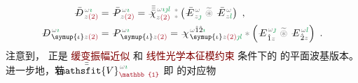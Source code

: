 \begin{subequations} \label{eq:DP^(2)-plane_wave_basis-p_pp}
\begin{align}
	\Xint{\mathcolor{gray}{-}}{30}{\bar{D}}^{\;\! \mathcolor{gray}{\omega} \textcolor{ForestGreen}{\imath}}_{\;\! \mathcolor{gray}{z} \textcolor{Maroon}{(2)}} &= \Xint{\mathcolor{gray}{-}}{30}{\bar{P}}^{\;\! \mathcolor{gray}{\omega} \textcolor{ForestGreen}{\imath}}_{\;\! \mathcolor{gray}{z} \textcolor{Maroon}{(2)}} = \Xint{{}^{}_{\mathcolor{gray}{-}}}{23}{\bar{\bar{\bar{\chi}}}}^{\;\! \mathcolor{gray}{\omega} \textcolor{ForestGreen}{\imath \jmath l}}_{\mathcolor{gray}{z} \textcolor{Maroon}{(2)}} ~{}^{\mathcolor{gray}{*}}_{\mathcolor{gray}{*}} \left( \Xint{\mathcolor{gray}{-}}{295}{\bar{E}}^{\;\!\mathcolor{gray}{\omega}}_{\;\! \mathcolor{gray}{z} \textcolor{ForestGreen}{\jmath} } ~\mathcolor{gray}{\widetilde \circledast}~ \Xint{\mathcolor{gray}{-}}{295}{\bar{E}}^{\;\!\mathcolor{gray}{\omega}}_{\;\! \mathcolor{gray}{z} \textcolor{ForestGreen}{l} } \right) ~, \label{eq:vec-DP^(2)-plane_wave_basis-p_pp} \\
	\Xint{\mathcolor{gray}{-}}{30}{D}^{\;\! \mathcolor{gray}{\omega} \textcolor{ForestGreen}{\imath}}_{\;\! \symup{\iota}\mathcolor{gray}{z} \textcolor{Maroon}{(2)}} &= \Xint{\mathcolor{gray}{-}}{30}{P}^{\;\! \mathcolor{gray}{\omega} \textcolor{ForestGreen}{\imath}}_{\;\! \symup{\iota}\mathcolor{gray}{z} \textcolor{Maroon}{(2)}} = \Xint{{}^{}_{\mathcolor{gray}{-}}}{23}{\chi}^{\;\! \mathcolor{gray}{\omega} \hat{1} \hat{2} \textcolor{ForestGreen}{\imath}}_{\;\! \symup{\iota} \mathcolor{gray}{z} \textcolor{Maroon}{(2)} \textcolor{ForestGreen}{\jmath l}} \mathcolor{gray}{*} \left( \Xint{\mathcolor{gray}{-}}{295}{E}^{\;\!\mathcolor{gray}{\omega} \textcolor{ForestGreen}{\jmath}}_{\;\! \hat{1} \mathcolor{gray}{z}} ~\mathcolor{gray}{\widetilde \circledast}~ \Xint{\mathcolor{gray}{-}}{295}{E}^{\;\!\mathcolor{gray}{\omega} \textcolor{ForestGreen}{l}}_{\;\! \hat{2} \mathcolor{gray}{z}} \right) ~. \label{eq:components-DP^(2)-plane_wave_basis-p_pp}
\end{align}
\end{subequations}
注意到， 正是 \textcolor{Maroon}{缓变振幅近似} 和 \textcolor{Maroon}{线性光学本征模约束}  条件下的  的平面波基版本。进一步地，若 $\Xint{\mathcolor{gray}{-}}{25}{\bar{\bar{\mathsfit{V}}}}^{\;\! \mathcolor{gray}{\omega} \textcolor{ForestGreen}{\imath}}_{\textcolor{Maroon}{\mathbb{1}}}$ 
即  的对应物
